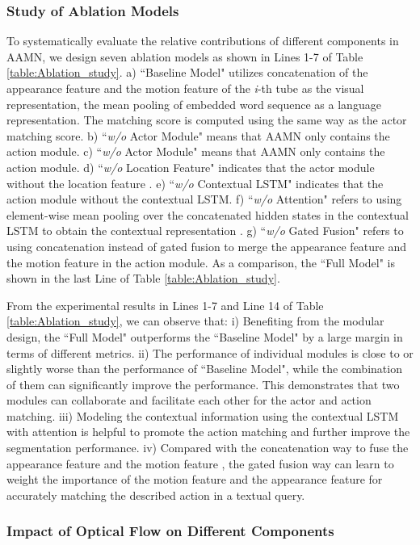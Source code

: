 \documentclass[journal]{IEEEtran}
\begin{document}
\subsubsection{Study of Ablation Models}
To systematically evaluate the relative contributions of different components in AAMN, we design seven ablation models as shown in Lines 1-7 of Table \ref{table:Ablation_study}. a) ``Baseline Model" utilizes concatenation of the appearance feature  and the motion feature  of the \emph{i}-th tube as the visual representation, the mean pooling of embedded word sequence as a language representation. The matching score is computed using the same way as the actor matching score. b) ``\emph{w/o} Actor Module" means that AAMN only contains the action module. c) ``\emph{w/o} Actor Module" means that AAMN only contains the action module. d) ``\emph{w/o} Location Feature" indicates that the actor module without the location feature . e) ``\emph{w/o} Contextual LSTM" indicates that the action module without the contextual LSTM. f) ``\emph{w/o} Attention" refers to using element-wise mean pooling over the concatenated hidden states  in the contextual LSTM to obtain the contextual representation . g) ``\emph{w/o} Gated Fusion" refers to using concatenation instead of gated fusion to merge the appearance feature  and the motion feature  in the action module. As a comparison, the ``Full Model" is shown in the last Line of Table \ref{table:Ablation_study}.

From the experimental results in Lines 1-7 and Line 14 of Table \ref{table:Ablation_study}, we can observe that: i) Benefiting from the modular design, the ``Full Model" outperforms the ``Baseline Model" by a large margin in terms of different metrics. ii) The performance of individual modules is close to or slightly worse than the performance of ``Baseline Model", while the combination of them can significantly improve the performance. This demonstrates that two modules can collaborate and facilitate each other for the actor and action matching. iii) Modeling the contextual information using the contextual LSTM with attention is helpful to promote the action matching and further improve the segmentation performance. iv) Compared with the concatenation way to fuse the appearance feature  and the motion feature , the gated fusion way can learn to weight the importance of the motion feature  and the appearance feature  for accurately matching the described action in a textual query.


\subsubsection{Impact of Optical Flow on Different Components}
\end{document}

